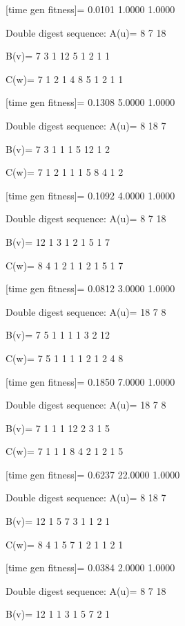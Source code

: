 [time gen fitness]=
    0.0101    1.0000    1.0000

Double digest sequence:
A(u)=
     8     7    18

B(v)=
     7     3     1    12     5     1     2     1     1

C(w)=
     7     1     2     1     4     8     5     1     2     1     1

[time gen fitness]=
    0.1308    5.0000    1.0000

Double digest sequence:
A(u)=
     8    18     7

B(v)=
     7     3     1     1     1     5    12     1     2

C(w)=
     7     1     2     1     1     1     5     8     4     1     2

[time gen fitness]=
    0.1092    4.0000    1.0000

Double digest sequence:
A(u)=
     8     7    18

B(v)=
    12     1     3     1     2     1     5     1     7

C(w)=
     8     4     1     2     1     1     2     1     5     1     7

[time gen fitness]=
    0.0812    3.0000    1.0000

Double digest sequence:
A(u)=
    18     7     8

B(v)=
     7     5     1     1     1     1     3     2    12

C(w)=
     7     5     1     1     1     1     2     1     2     4     8

[time gen fitness]=
    0.1850    7.0000    1.0000

Double digest sequence:
A(u)=
    18     7     8

B(v)=
     7     1     1     1    12     2     3     1     5

C(w)=
     7     1     1     1     8     4     2     1     2     1     5

[time gen fitness]=
    0.6237   22.0000    1.0000

Double digest sequence:
A(u)=
     8    18     7

B(v)=
    12     1     5     7     3     1     1     2     1

C(w)=
     8     4     1     5     7     1     2     1     1     2     1

[time gen fitness]=
    0.0384    2.0000    1.0000

Double digest sequence:
A(u)=
     8     7    18

B(v)=
    12     1     1     3     1     5     7     2     1

